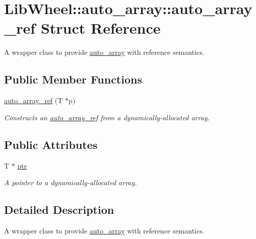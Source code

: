 \hypertarget{structLibWheel_1_1auto__array_1_1auto__array__ref}{
\section{\-Lib\-Wheel\-:\-:auto\-\_\-array\-:\-:auto\-\_\-array\-\_\-ref \-Struct \-Reference}
\label{structLibWheel_1_1auto__array_1_1auto__array__ref}
}


\-A wrapper class to provide \hyperlink{classLibWheel_1_1auto__array}{auto\-\_\-array} with reference semantics.  


\subsection*{\-Public \-Member \-Functions}
\begin{DoxyCompactItemize}
\item 
\hyperlink{structLibWheel_1_1auto__array_1_1auto__array__ref_adbadef8dd16ee7e44e07c4f8cc705c31}{auto\-\_\-array\-\_\-ref} (\-T $\ast$p)
\begin{DoxyCompactList}\small\item\em \-Constructs an \hyperlink{structLibWheel_1_1auto__array_1_1auto__array__ref}{auto\-\_\-array\-\_\-ref} from a dynamically-\/allocated array. \end{DoxyCompactList}\end{DoxyCompactItemize}
\subsection*{\-Public \-Attributes}
\begin{DoxyCompactItemize}
\item 
\-T $\ast$ \hyperlink{structLibWheel_1_1auto__array_1_1auto__array__ref_aa1b85aa832adb49bc9981635fee6047e}{ptr}
\begin{DoxyCompactList}\small\item\em \-A pointer to a dynamically-\/allocated array. \end{DoxyCompactList}\end{DoxyCompactItemize}


\subsection{\-Detailed \-Description}
\-A wrapper class to provide \hyperlink{classLibWheel_1_1auto__array}{auto\-\_\-array} with reference semantics. 


